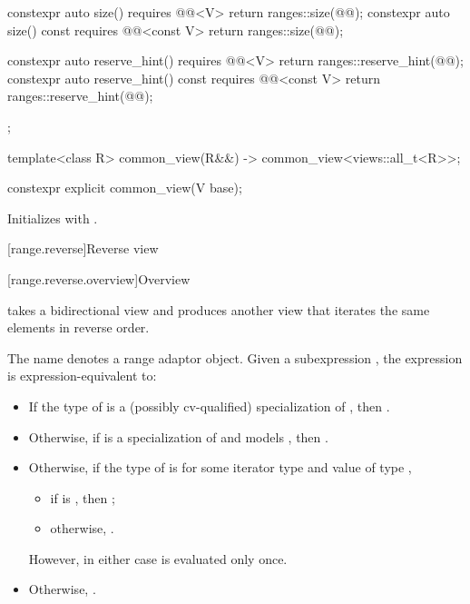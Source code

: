 \begin{codeblock}
{{    constexpr auto size() requires @@<V> {
      return ranges::size(@@);
    }
    constexpr auto size() const requires @@<const V> {
      return ranges::size(@@);
    }

    constexpr auto reserve_hint() requires @@<V> {
      return ranges::reserve_hint(@@);
    }
    constexpr auto reserve_hint() const requires @@<const V> {
      return ranges::reserve_hint(@@);
    }
  };

  template<class R>
    common_view(R&&) -> common_view<views::all_t<R>>;
}
\end{codeblock}

%
\begin{itemdecl}
constexpr explicit common_view(V base);
\end{itemdecl}

\begin{itemdescr}
\pnum
\effects
Initializes  with .
\end{itemdescr}

[range.reverse]{Reverse view}

[range.reverse.overview]{Overview}

\pnum
{} takes a bidirectional view and produces
another view that iterates the same elements in reverse order.

\pnum
{}%
The name  denotes a
range adaptor object.
Given a subexpression , the expression
 is expression-equivalent to:
\begin{itemize}
\item
  If the type of  is
  a (possibly cv-qualified) specialization of ,
  then .

\item
  Otherwise, if  is a specialization of  and 
  models , then .

\item
  Otherwise, if the type of  is \cv{} 
  for some iterator type  and
  value  of type ,
  \begin{itemize}
  \item
    if  is , then
;
  \item
    otherwise, .
  \end{itemize}
  However, in either case  is evaluated only once.
\item
  Otherwise, .
\end{itemize}

